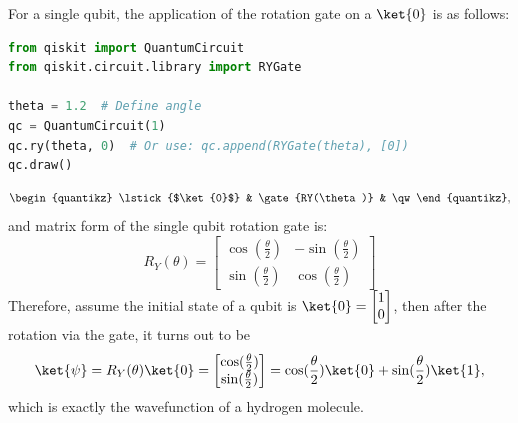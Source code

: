 For a single qubit, the application of the rotation gate on a $\ket{0}$ is as follows:
\begin{lstlisting}[language=Python, caption=Sample Python Code, frame=single]
from qiskit import QuantumCircuit
from qiskit.circuit.library import RYGate

theta = 1.2  # Define angle
qc = QuantumCircuit(1)
qc.ry(theta, 0)  # Or use: qc.append(RYGate(theta), [0])
qc.draw()
\end{lstlisting}

    
\begin{equation}
    \begin{quantikz}
        \lstick{$\ket{0}$} & \gate{RY(\theta)} & \qw
    \end{quantikz},    
\end{equation}
and matrix form of the single qubit rotation gate is:
\begin{equation}
    R_Y(\theta)=\begin{bmatrix}
    \cos(\frac{\theta}{2}) & -\sin(\frac{\theta}{2}) \\ \sin(\frac{\theta}{2}) & \cos(\frac{\theta}{2})
    \end{bmatrix}
\end{equation}
Therefore, assume the initial state of a qubit is $\ket{0}=\begin{bmatrix}1\\0\end{bmatrix}$, then after the rotation via the gate, it turns out to be 
\begin{equation}
    \ket{\psi}=R_Y(\theta)\ket{0}=\begin{bmatrix}
        \cos(\frac{\theta}{2}) \\ \sin(\frac{\theta}{2})
    \end{bmatrix} = \cos(\frac{\theta}{2})\ket{0}+\sin(\frac{\theta}{2})\ket{1},
\end{equation}
which is exactly the wavefunction of a hydrogen molecule. 

